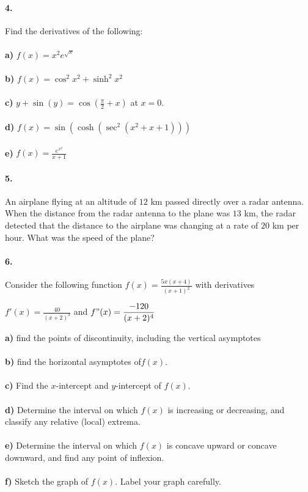 \documentclass[12pt,oneside,oldfontcommands]{memoir}
\begin{document}
	\paragraph{4.}
	Find the derivatives of the following:
	\\
	\\
	\textbf{a)} $ \displaystyle f(x)=x^2e^{\sqrt{x}}$\\
	\\
	\textbf{b)} $ \displaystyle f(x) = \cos^2{x^2}+\sinh^2{x^2}$\\
	\\
	\textbf{c)} $ \displaystyle y+\sin(y)=\cos(\frac{\pi}{2}+x)$ at $x=0$.\\
	\\
	\textbf{d)} $ \displaystyle f(x)=\sin(\cosh(\sec^2(x^2+x+1)))$\\
	\\
	\textbf{e)} $ \displaystyle f(x)=\frac{e^{x^2}}{x+1}$\\
	
	\paragraph{5.}
	An airplane flying at an altitude of $12$ km passed directly over a radar antenna. When
	the distance from the radar antenna to the plane was $13$ km, the radar detected that the
	distance to the airplane was changing at a rate of $20$ km per hour. What was the speed of
	the plane?
	
	\paragraph{6.}
	Consider the following function
		$\displaystyle f(x) = \frac{5x(x+4)}{(x+1)^2}$ with derivatives
		\begin{center}
		$\displaystyle f'(x) = \frac{40}{(x+2)^3}$ \hspace{16pt} and \hspace{16pt} $\displaystyle f"(x) = \frac{-120}{(x+2)^4}$\\
		\end{center}
		
	\textbf{a)} find the points of discontinuity, including the  vertical asymptotes\\
	\\
	\textbf{b)} find the horizontal asymptotes of$ \displaystyle f(x).$\\
	\\
	\textbf{c)} Find the $x$-intercept and $y$-intercept of $f(x)$.\\
	\\
	\textbf{d)} Determine the interval on which $f(x)$ is increasing or decreasing, and classify any relative (local) extrema.\\
	\\
	\textbf{e)} Determine the interval on which $f(x)$ is concave upward or concave downward, and find any point of inflexion.\\
	\\
	\textbf{f)} Sketch the graph of $f(x)$. Label your graph carefully.
	
\end{document}
